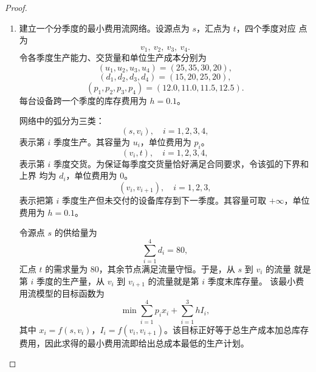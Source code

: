 \documentclass[11pt, a4paper]{article}
\begin{document}
\begin{proof}
    \begin{enumerate}[label=(\arabic*)]
        \item 建立一个分季度的最小费用流网络。设源点为 $s$，汇点为 $t$，四个季度对应
        点为
        \[
            v_1,\ v_2,\ v_3,\ v_4.
        \]
        令各季度生产能力、交货量和单位生产成本分别为
        \[
            (u_1,u_2,u_3,u_4)=(25,35,30,20),
        \]
        \[
            (d_1,d_2,d_3,d_4)=(15,20,25,20),
        \]
        \[
            (p_1,p_2,p_3,p_4)=(12.0,11.0,11.5,12.5).
        \]
        每台设备跨一个季度的库存费用为 $h=0.1$。

        网络中的弧分为三类：
        \[
            (s,v_i),\quad i=1,2,3,4,
        \]
        表示第 $i$ 季度生产。其容量为 $u_i$，单位费用为 $p_i$。
        \[
            (v_i,t),\quad i=1,2,3,4,
        \]
        表示第 $i$ 季度交货。为保证每季度交货量恰好满足合同要求，令该弧的下界和上界
        均为 $d_i$，单位费用为 $0$。
        \[
            (v_i,v_{i+1}),\quad i=1,2,3,
        \]
        表示把第 $i$ 季度生产但未交付的设备库存到下一季度。其容量可取
        $+\infty$，单位费用为 $h=0.1$。

        令源点 $s$ 的供给量为
        \[
            \sum_{i=1}^4 d_i=80,
        \]
        汇点 $t$ 的需求量为 $80$，其余节点满足流量守恒。于是，从 $s$ 到 $v_i$ 的流量
        就是第 $i$ 季度的生产量，从 $v_i$ 到 $v_{i+1}$ 的流量就是第 $i$ 季度末库存量。
        该最小费用流模型的目标函数为
        \[
            \min \sum_{i=1}^4 p_i x_i+\sum_{i=1}^3 h I_i,
        \]
        其中 $x_i=f(s,v_i)$，$I_i=f(v_i,v_{i+1})$。该目标正好等于总生产成本加总库存
        费用，因此求得的最小费用流即给出总成本最低的生产计划。
    \end{enumerate}
\end{proof}

\vspace{1em}
\end{document}
